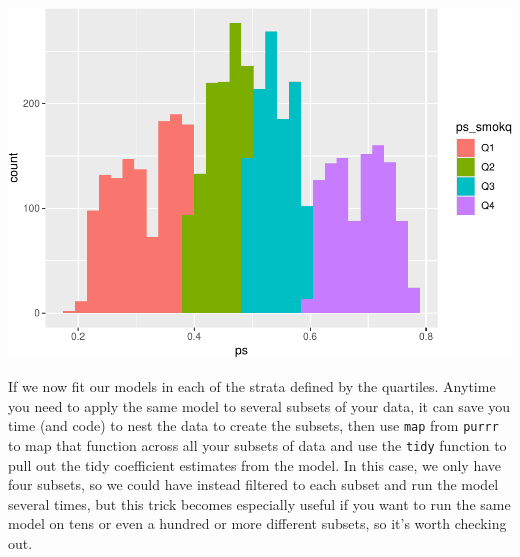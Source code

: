 \documentclass[
]{book}
\begin{document}
\includegraphics{adv_epi_analysis_files/figure-latex/unnamed-chunk-279-1.pdf}

If we now fit our models in each of the strata defined by the quartiles. Anytime you need to apply the same model to several subsets of your data, it can save you time (and code) to nest the data to create the subsets, then use \texttt{map} from \texttt{purrr} to map that function across all your subsets of data and use the \texttt{tidy} function to pull out the tidy coefficient estimates from the model. In this case, we only have four subsets, so we could have instead filtered to each subset and run the model several times, but this trick becomes especially useful if you want to run the same model on tens or even a hundred or more different subsets, so it's worth checking out.
\end{document}
